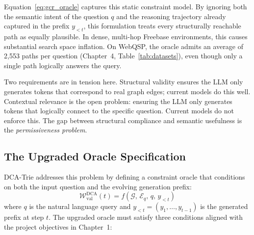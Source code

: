 Equation~\eqref{eq:gcr_oracle} captures this static constraint model. By ignoring both the semantic intent of the question $q$ and the reasoning trajectory already captured in the prefix $y_{<t}$, this formulation treats every structurally reachable path as equally plausible. In dense, multi-hop Freebase environments, this causes substantial search space inflation. On WebQSP, the oracle admits an average of 2,553 paths per question (Chapter~4, Table~\ref{tab:datasets}), even though only a single path logically answers the query.

Two requirements are in tension here. Structural validity ensures the LLM only generates tokens that correspond to real graph edges; current models do this well. Contextual relevance is the open problem: ensuring the LLM only generates tokens that logically connect to the specific question. Current models do not enforce this. The gap between structural compliance and semantic usefulness is the \textit{permissiveness problem}.

\subsection{The Upgraded Oracle Specification}

DCA-Trie addresses this problem by defining a constraint oracle that conditions on both the input question and the evolving generation prefix:
\begin{equation}
  \mathcal{W}_{\text{val}}^{\text{DCA}}(t) = f(\mathcal{G},\, \mathcal{E}_q,\,
  q,\, y_{<t})
  \label{eq:dca_oracle}
\end{equation}
where $q$ is the natural language query and $y_{<t} = (y_1, \ldots, y_{t-1})$ is the generated prefix at step $t$. The upgraded oracle must satisfy three conditions aligned with the project objectives in Chapter~1:

